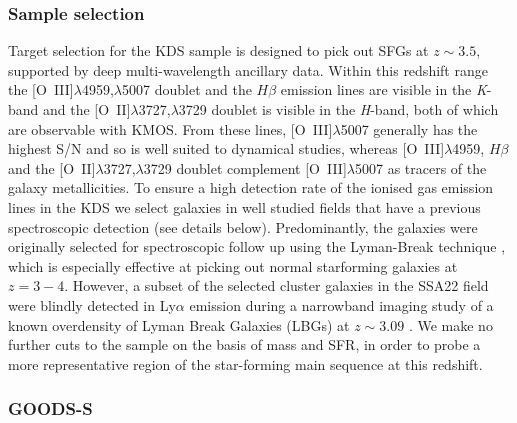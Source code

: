 \documentclass[fleqn,usenatbib]{mn2e}
\begin{document}
\subsubsection{Sample selection}\label{subsubsec:sample_selection}
Target selection for the KDS sample is designed to pick out SFGs at $z \sim 3.5$, supported by deep multi-wavelength ancillary data.
Within this redshift range the [O~{\sc III}]$\lambda$4959,$\lambda$5007 doublet and the $H\beta$ emission lines are visible in the {\it K}-band and the [O~{\sc II}]$\lambda$3727,$\lambda$3729 doublet is visible in the {\it H}-band, both of which are observable with KMOS.
From these lines, [O~{\sc III}]$\lambda$5007 generally has the highest S/N and so is well suited to dynamical studies, whereas [O~{\sc III}]$\lambda$4959, $H\beta$ and the [O~{\sc II}]$\lambda$3727,$\lambda$3729 doublet complement [O~{\sc III}]$\lambda$5007 as tracers of the galaxy metallicities. 
To ensure a high detection rate of the ionised gas emission lines in the KDS we select galaxies in well studied fields that have a previous spectroscopic detection (see details below).
Predominantly, the galaxies were originally selected for spectroscopic follow up using the Lyman-Break technique \citep{Steidel1996}, which is especially effective at picking out normal starforming galaxies at $z = 3-4$.
However, a subset of the selected cluster galaxies in the SSA22 field were blindly detected in Ly$\alpha$ emission during a narrowband imaging study of a known overdensity of Lyman Break Galaxies (LBGs) at $z \sim 3.09$ \citep{Steidel2000}.
We make no further cuts to the sample on the basis of mass and SFR, in order to probe a more representative region of the star-forming main sequence at this redshift.

\subsubsection{GOODS-S}\label{subsubsec:sample_selection_goods}
\end{document}
